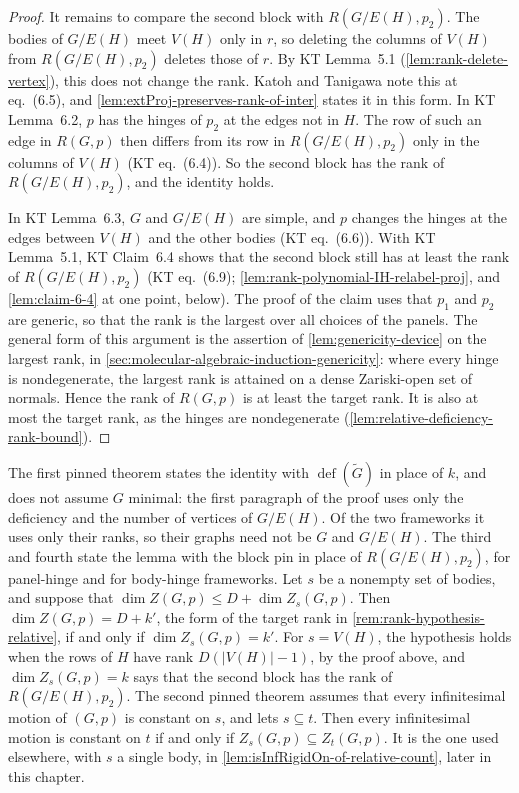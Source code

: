 \begin{proof}
  It remains to compare the second block with $R(G/E(H), p_2)$. The
  bodies of $G/E(H)$ meet $V(H)$ only in $r$, so deleting the columns of
  $V(H)$ from $R(G/E(H), p_2)$ deletes those of $r$. By KT Lemma~5.1
  (\cref{lem:rank-delete-vertex}), this does not change the rank. Katoh
  and Tanigawa note this at eq.~(6.5), and
  \cref{lem:extProj-preserves-rank-of-inter} states it in this form. In
  KT Lemma~6.2, $p$ has the hinges of $p_2$ at the edges not in $H$. The
  row of such an edge in $R(G,p)$ then differs from its row in $R(G/E(H), p_2)$ only in the
  columns of $V(H)$ (KT eq.~(6.4)). So the second block has the rank of
  $R(G/E(H), p_2)$, and the identity holds.

  In KT Lemma~6.3, $G$ and $G/E(H)$ are simple, and $p$ changes the
  hinges at the edges between $V(H)$ and the other bodies (KT
  eq.~(6.6)). With KT Lemma~5.1, KT Claim~6.4 shows that the second
  block still has at least the rank of $R(G/E(H), p_2)$ (KT eq.~(6.9);
  \cref{lem:rank-polynomial-IH-relabel-proj}, and \cref{lem:claim-6-4} at
  one point, below). The proof of the claim uses that $p_1$
  and $p_2$ are generic, so that the rank is the largest over all choices
  of the panels.
  The general form of this argument is the assertion of
  \cref{lem:genericity-device} on the largest rank, in
  \cref{sec:molecular-algebraic-induction-genericity}: where every hinge
  is nondegenerate, the largest rank is attained on a dense Zariski-open
  set of normals. Hence the rank of
  $R(G,p)$ is at least the target rank. It is also at most the target
  rank, as the hinges are nondegenerate
  (\cref{lem:relative-deficiency-rank-bound}).
\end{proof}

\begin{fmlnote}
  The first pinned theorem states the identity with
  $\operatorname{def}(\tilde G)$ in place of $k$, and does not assume
  $G$ minimal: the first paragraph of the proof uses only the deficiency
  and the number of vertices of $G/E(H)$. Of the two frameworks it uses
  only their ranks, so their graphs need not be $G$ and $G/E(H)$. The
  third and fourth state the lemma with the block pin in place of
  $R(G/E(H), p_2)$, for panel-hinge and for body-hinge frameworks. Let
  $s$ be a nonempty set of bodies, and suppose that
  $\dim Z(G,p) \le D + \dim Z_s(G,p)$. Then
  $\dim Z(G,p) = D + k'$, the form of the target rank in
  \cref{rem:rank-hypothesis-relative}, if and only if
  $\dim Z_s(G,p) = k'$. For $s = V(H)$, the hypothesis holds when the rows
  of $H$ have rank $D(|V(H)| - 1)$, by the proof above, and
  $\dim Z_s(G,p) = k$ says that the second block has the rank of
  $R(G/E(H), p_2)$. The second pinned theorem assumes that every
  infinitesimal motion of $(G,p)$ is constant on $s$, and lets
  $s \subseteq t$. Then every infinitesimal motion is constant on $t$ if
  and only if $Z_s(G,p) \subseteq Z_t(G,p)$. It is the one used
  elsewhere, with $s$ a single body, in
  \cref{lem:isInfRigidOn-of-relative-count}, later in this chapter.
\end{fmlnote}

